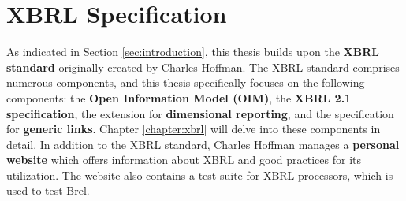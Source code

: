 \section{XBRL Specification}
As indicated in Section \ref{sec:introduction}, this thesis builds upon the 
\textcolor{airforceblue}{\textbf{XBRL standard}}\cite{xbrl} 
originally created by Charles Hoffman\cite{xbrl}.
The XBRL standard comprises numerous components, and this thesis specifically focuses on the following components: 
the \textcolor{airforceblue}{\textbf{Open Information Model (OIM)}}\cite{oim},
the \textcolor{airforceblue}{\textbf{XBRL 2.1 specification}}\cite{xbrl21},
the extension for \textcolor{airforceblue}{\textbf{dimensional reporting}}\cite{xbrl_dimensions},
and the specification for \textcolor{airforceblue}{\textbf{generic links}}\cite{xbrl_generic_links}.
Chapter \ref{chapter:xbrl} will delve into these components in detail.
In addition to the XBRL standard, Charles Hoffman manages a 
\textcolor{airforceblue}{\textbf{personal website}}\cite{seattle_method}
which offers information about XBRL and good practices for its utilization.
The website also contains a test suite for XBRL processors, which is used to test Brel.


